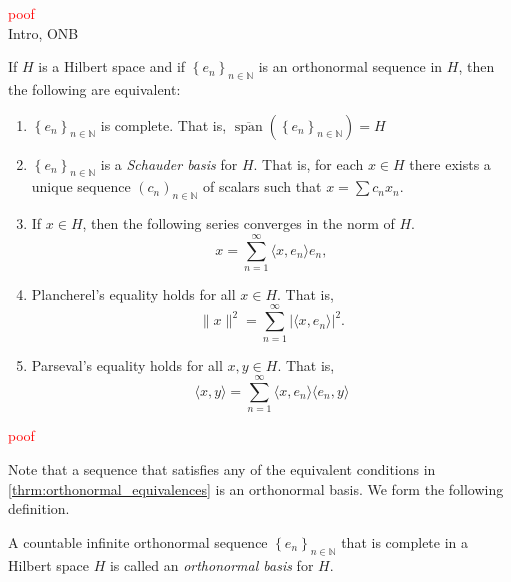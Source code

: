 \documentclass[../thesis.tex]{subfiles}
\begin{document}
%
%
\textcolor{red}{poof}\\
Intro, ONB
%
%
\begin{theorem}\label{thrm:orthonormal_equivalences}
    If $H$ is a Hilbert space and if $\left\{ e_{n} \right\}_{n\in \mathbb{N}}$ is an orthonormal sequence in $H$,  then the following are equivalent:
    \begin{enumerate}[label=(\alph*)]
        \item \label{eq:oe_a} $\left\{ e_{n} \right\}_{n\in \mathbb{N}}$ is complete. That is, $\overline{\operatorname{span}} \left( \left\{ e_{n} \right\}_{n\in \mathbb{N}} \right) = H$
        
        \item \label{eq:oe_b} $\left\{ e_{n} \right\}_{n\in \mathbb{N}}$ is a \emph{Schauder basis} for $H$. That is, for each $x\in H$ there exists a unique sequence  $(c_n)_{n\in\mathbb{N}}$ of scalars such that $x = \sum c_n x_n$.
        
        \item \label{eq:oe_c} If $x\in H$, then the following series converges in the norm of $H$. \begin{equation} \label{eq:orthonormal_equivalences_3} x=\sum_{n=1}^\infty \langle x,e_n\rangle e_n, \end{equation}
        
        \item \label{eq:oe_d} Plancherel's equality holds for all $x \in H$. That is, $$ \|x \|^2 = \sum_{n=1}^\infty \left| \langle x,e_n \rangle \right|^2.$$
        
        \item \label{eq:oe_e} Parseval's equality holds for all $x,y \in H$. That is, $$ \langle x,y \rangle = \sum_{n=1}^\infty \langle x,e_n \rangle \langle e_n,y \rangle $$
    \end{enumerate}
\end{theorem}
%
\textcolor{red}{poof}

Note that a sequence that satisfies any of the equivalent conditions in \cref{thrm:orthonormal_equivalences} is an orthonormal basis. We form the following definition.


\begin{definition}
    A countable infinite orthonormal sequence $\left\{ e_{n} \right\}_{n\in \mathbb{N}}$ that is complete in a Hilbert space $H$ is called an \emph{orthonormal basis} for $H$.
\end{definition}
\end{document}
